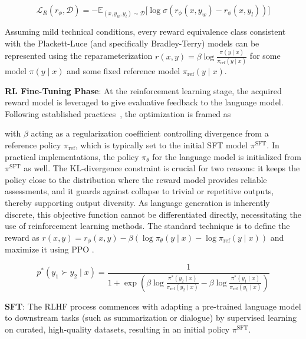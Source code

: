 \begin{equation}\label{eq:reward_model}
    \mathcal{L}_R(r_{\phi}, \mathcal{D}) = -\mathbb{E}_{(x, y_w, y_l)\sim \mathcal{D}}\bigl[\log \sigma(r_{\phi}(x, y_w)- r_{\phi}(x, y_l))\bigr]
\end{equation}

\begin{theorem}\label{thm:main}
    Assuming mild technical conditions, every reward equivalence class consistent with the Plackett-Luce (and specifically Bradley-Terry) models can be represented using the reparameterization ${r(x, y) = \beta \log \frac{\pi(y\mid x)}{\pi_\text{ref}(y\mid x)}}$ for some model $\pi(y\mid x)$ and some fixed reference model $\pi_\text{ref}(y \mid x)$.
\end{theorem}

\textbf{RL Fine-Tuning Phase}: At the reinforcement learning stage, the acquired reward model is leveraged to give evaluative feedback to the language model. Following established practices~\citep{jaques2017sequence, jaques2020human}, the optimization is framed as

with $\beta$ acting as a regularization coefficient controlling divergence from a reference policy $\pi_\text{ref}$, which is typically set to the initial SFT model $\pi^\text{SFT}$. In practical implementations, the policy $\pi_\theta$ for the language model is initialized from $\pi^\text{SFT}$ as well. The KL-divergence constraint is crucial for two reasons: it keeps the policy close to the distribution where the reward model provides reliable assessments, and it guards against collapse to trivial or repetitive outputs, thereby supporting output diversity. As language generation is inherently discrete, this objective function cannot be differentiated directly, necessitating the use of reinforcement learning methods. The standard technique \citep{ziegler2020finetuning, stiennon2022learning, bai2022training, ouyang2022training} is to define the reward as ${r(x, y) = r_{\phi}(x, y) -\beta (\log \pi_{\theta}(y\mid x) - \log \pi_\text{ref}(y\mid x))}$ and maximize it using PPO \cite{schulman2017proximal}.

\begin{equation}\label{eq:objective}
    p^*(y_1\succ y_2 \mid x)=\frac{1}{1 + \exp\left(\beta \log \frac{\pi^*(y_2\mid x)}{\pi_\text{ref}(y_2\mid x)} - \beta \log \frac{\pi^*(y_1\mid x)}{\pi_\text{ref}(y_1\mid x)}\right)}
\end{equation}

\textbf{SFT}: The RLHF process commences with adapting a pre-trained language model to downstream tasks (such as summarization or dialogue) by supervised learning on curated, high-quality datasets, resulting in an initial policy $\pi^\text{SFT}$.



